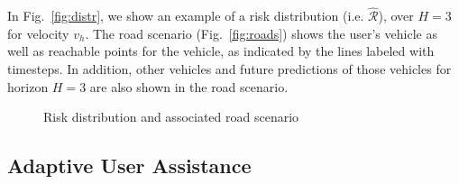\documentclass[letterpaper, 10 pt, conference]{ieeeconf}  %
\newcommand\NB[1]{$\spadesuit$\footnote{NB: #1}}
\begin{document}
 In Fig.~\ref{fig:distr}, we show an example of a risk distribution (i.e. $\hat{\mathcal{R}}$), over $H=3$ for velocity $v_h$. The road scenario (Fig.~\ref{fig:roads}) shows the user's vehicle as well as reachable points for the vehicle, as indicated by the lines labeled with timesteps. In addition, other vehicles and future predictions of those vehicles for horizon $H=3$ are also shown in the road scenario.

\begin{figure}[ht!]
	\centering
	\vspace{-5pt}
	\caption{Risk distribution and associated road scenario}
	\label{fig:riskd}
	\vspace{-15pt}
\end{figure}


\subsection{Adaptive User Assistance}
\end{document}
